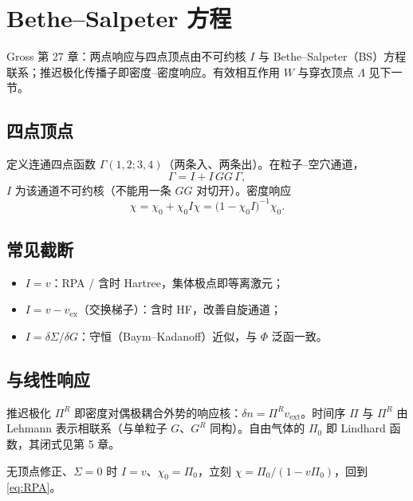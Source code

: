 \section{Bethe--Salpeter 方程}

Gross 第 27 章：两点响应与四点顶点由不可约核 $I$ 与 Bethe--Salpeter（BS）方程联系；推迟极化传播子即密度--密度响应。有效相互作用 $W$ 与穿衣顶点 $\Lambda$ 见下一节。

\subsection{四点顶点}

定义连通四点函数 $\Gamma(1,2;3,4)$（两条入、两条出）。在粒子--空穴通道，
\begin{equation}
  \Gamma
  =I
  +I\,G G\,\Gamma,
\label{eq:BS}
\end{equation}
$I$ 为该通道不可约核（不能用一条 $G G$ 对切开）。密度响应
\begin{equation}
  \chi
  =\chi_0+\chi_0 I\chi
  =\bigl(1-\chi_0 I\bigr)^{-1}\chi_0.
\end{equation}

\subsection{常见截断}

\begin{itemize}
  \item $I=v$：RPA / 含时 Hartree，集体极点即等离激元；
  \item $I=v-v_{\mathrm{ex}}$（交换梯子）：含时 HF，改善自旋通道；
  \item $I=\delta\Sigma/\delta G$：守恒（Baym--Kadanoff）近似，与 $\Phi$ 泛函一致。
\end{itemize}

\subsection{与线性响应}

推迟极化 $\Pi^R$ 即密度对偶极耦合外势的响应核：$\delta n=\Pi^R v_{\mathrm{ext}}$。时间序 $\Pi$ 与 $\Pi^R$ 由 Lehmann 表示相联系（与单粒子 $G$、$G^R$ 同构）。自由气体的 $\Pi_0$ 即 Lindhard 函数，其闭式见第 5 章。

\begin{example}[从 BS 到 RPA]
无顶点修正、$\Sigma=0$ 时 $I=v$、$\chi_0=\Pi_0$，立刻 $\chi=\Pi_0/(1-v\Pi_0)$，回到 \eqref{eq:RPA}。
\end{example}
